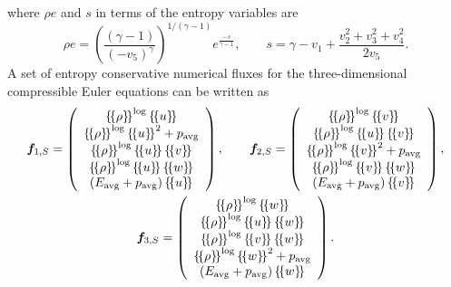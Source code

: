\documentclass[preprint,10pt]{article}
\theoremstyle{definition}
\theoremstyle{lemma}
\theoremstyle{theorem}
\theoremstyle{assumption}
\newcommand{\LRp}[1]{\left( #1 \right)}
\newcommand{\LRc}[1]{\left\{ #1 \right\}}
\newcommand{\avg}[1] {\ensuremath{\LRc{\!\{#1\}\!}}}
\begin{document}
{\begin{equation}
\end{equation}
where $\rho e$ and $s$ in terms of the entropy variables are 
\begin{equation}
\rho e = \LRp{\frac{(\gamma-1)}{\LRp{-v_5}^{\gamma}}}^{1/(\gamma-1)}e^{\frac{-s}{\gamma-1}}, \qquad s = \gamma - v_1 + \frac{{v_2^2+v_3^2+v_4^2}}{2v_5}.
\end{equation}
A set of entropy conservative numerical fluxes for the three-dimensional compressible Euler equations can be written as
\begin{gather}
\bm{f}_{1,S} = \LRp{\begin{array}{c}
\avg{\rho}^{\log}\avg{u}\\
\avg{\rho}^{\log}\avg{u}^2 + p_{\rm avg}\\
\avg{\rho}^{\log}\avg{u}\avg{v}\\
\avg{\rho}^{\log}\avg{u}\avg{w}\\
(E_{\rm avg}+ p_{\rm avg})\avg{u}\\
\end{array}}, 
\qquad 
\bm{f}_{2,S} = \LRp{\begin{array}{c}
\avg{\rho}^{\log}\avg{v}\\
\avg{\rho}^{\log}\avg{u}\avg{v}\\
\avg{\rho}^{\log}\avg{v}^2 + p_{\rm avg}\\
\avg{\rho}^{\log}\avg{v}\avg{w}\\
(E_{\rm avg}+ p_{\rm avg})\avg{v}\\
\end{array}},\\
\bm{f}_{3,S} = \LRp{\begin{array}{c}
\avg{\rho}^{\log}\avg{w}\\
\avg{\rho}^{\log}\avg{u}\avg{w}\\
\avg{\rho}^{\log}\avg{v}\avg{w}\\
\avg{\rho}^{\log}\avg{w}^2 + p_{\rm avg}\\
(E_{\rm avg}+ p_{\rm avg})\avg{w}\\
\end{array}}.\nonumber

\end{gather}}
\end{document}
